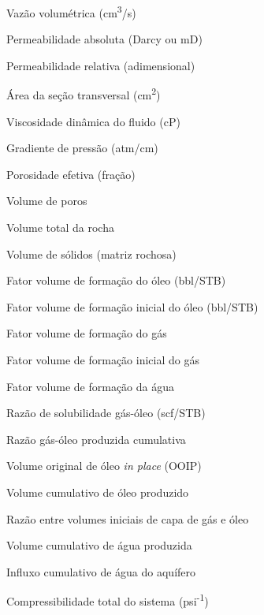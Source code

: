 \documentclass[
  12pt,
  a4paper,
  oneside,
  brazilian,
  sumario=tradicional
]{abntex2}
\begin{document}
\begin{simbolos}
  \item[$q$]                     Vazão volumétrica (cm\textsuperscript{3}/s)
  \item[$k$]                     Permeabilidade absoluta (Darcy ou mD)
  \item[$k_r$]                   Permeabilidade relativa (adimensional)
  \item[$A$]                     Área da seção transversal (cm\textsuperscript{2})
  \item[$\mu$]                   Viscosidade dinâmica do fluido (cP)
  \item[$dP/dL$]                 Gradiente de pressão (atm/cm)
  \item[$\phi$]                  Porosidade efetiva (fração)
  \item[$V_p$]                   Volume de poros
  \item[$V_t$]                   Volume total da rocha
  \item[$V_s$]                   Volume de sólidos (matriz rochosa)
  \item[$B_o$]                   Fator volume de formação do óleo (bbl/STB)
  \item[$B_{oi}$]                Fator volume de formação inicial do óleo (bbl/STB)
  \item[$B_g$]                   Fator volume de formação do gás
  \item[$B_{gi}$]                Fator volume de formação inicial do gás
  \item[$B_w$]                   Fator volume de formação da água
  \item[$R_s$]                   Razão de solubilidade gás-óleo (scf/STB)
  \item[$R_p$]                   Razão gás-óleo produzida cumulativa
  \item[$N$]                     Volume original de óleo \textit{in place} (OOIP)
  \item[$N_p$]                   Volume cumulativo de óleo produzido
  \item[$m$]                     Razão entre volumes iniciais de capa de gás e óleo
  \item[$W_p$]                   Volume cumulativo de água produzida
  \item[$W_e$]                   Influxo cumulativo de água do aquífero
  \item[$c_t$]                   Compressibilidade total do sistema (psi\textsuperscript{-1})

\end{simbolos}
\end{document}
